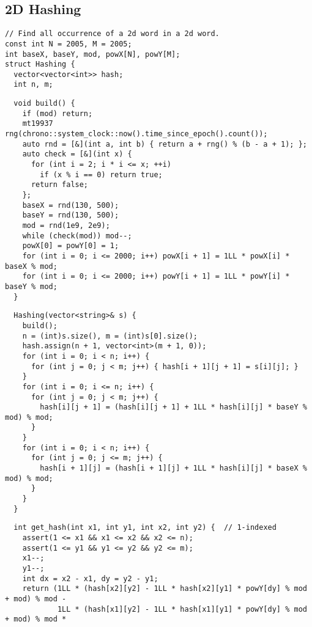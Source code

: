 \documentclass[twoside]{article}
\begin{document}
\begin{multicols*}{2}
{\subsection*{2D Hashing}
}
\begin{verbatim}
// Find all occurrence of a 2d word in a 2d word.
const int N = 2005, M = 2005;
int baseX, baseY, mod, powX[N], powY[M];
struct Hashing {
  vector<vector<int>> hash;
  int n, m;
\end{verbatim}
\vspace{-12pt}
\begin{verbatim}
  void build() {
    if (mod) return;
    mt19937 rng(chrono::system_clock::now().time_since_epoch().count());
    auto rnd = [&](int a, int b) { return a + rng() % (b - a + 1); };
    auto check = [&](int x) {
      for (int i = 2; i * i <= x; ++i)
        if (x % i == 0) return true;
      return false;
    };
    baseX = rnd(130, 500);
    baseY = rnd(130, 500);
    mod = rnd(1e9, 2e9);
    while (check(mod)) mod--;
    powX[0] = powY[0] = 1;
    for (int i = 0; i <= 2000; i++) powX[i + 1] = 1LL * powX[i] * baseX % mod;
    for (int i = 0; i <= 2000; i++) powY[i + 1] = 1LL * powY[i] * baseY % mod;
  }
\end{verbatim}
\vspace{-12pt}
\begin{verbatim}
  Hashing(vector<string>& s) {
    build();
    n = (int)s.size(), m = (int)s[0].size();
    hash.assign(n + 1, vector<int>(m + 1, 0));
    for (int i = 0; i < n; i++) {
      for (int j = 0; j < m; j++) { hash[i + 1][j + 1] = s[i][j]; }
    }
    for (int i = 0; i <= n; i++) {
      for (int j = 0; j < m; j++) {
        hash[i][j + 1] = (hash[i][j + 1] + 1LL * hash[i][j] * baseY % mod) % mod;
      }
    }
    for (int i = 0; i < n; i++) {
      for (int j = 0; j <= m; j++) {
        hash[i + 1][j] = (hash[i + 1][j] + 1LL * hash[i][j] * baseX % mod) % mod;
      }
    }
  }
  \end{verbatim}
\vspace{-12pt}
\begin{verbatim}
  int get_hash(int x1, int y1, int x2, int y2) {  // 1-indexed
    assert(1 <= x1 && x1 <= x2 && x2 <= n);
    assert(1 <= y1 && y1 <= y2 && y2 <= m);
    x1--;
    y1--;
    int dx = x2 - x1, dy = y2 - y1;
    return (1LL * (hash[x2][y2] - 1LL * hash[x2][y1] * powY[dy] % mod + mod) % mod -
            1LL * (hash[x1][y2] - 1LL * hash[x1][y1] * powY[dy] % mod + mod) % mod *

\end{verbatim}
\end{multicols*}
\end{document}
